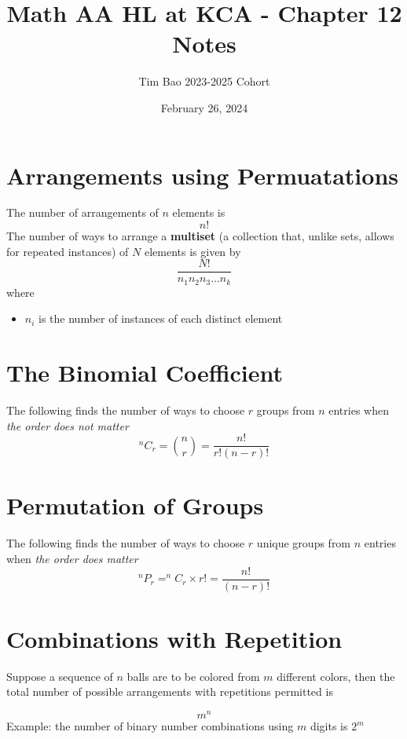 \documentclass[11pt]{article}
\title{Math AA HL at KCA - Chapter 12 Notes}
\author{Tim Bao 2023-2025 Cohort}
\date{February 26, 2024}
\begin{document}
\maketitle
\pagebreak
\tableofcontents
\pagebreak

\section{Arrangements using Permuatations}

The number of arrangements of $n$ elements is
$$n!$$
The number of ways to arrange a \textbf{multiset} (a collection that, unlike sets, allows for repeated instances) of $N$ elements is given by $$\frac{N!}{n_1n_2n_3\dots n_k}$$
where
\begin{itemize}
  \item $n_i$ is the number of instances of each distinct element
\end{itemize}


\section{The Binomial Coefficient}

The following finds the number of ways to choose $r$ groups from $n$ entries when \textit{the order does not matter}
$$^{n}C_{r} = {n \choose r} = \frac{n!}{r!(n-r)!}$$

\section{Permutation of Groups}

The following finds the number of ways to choose $r$ unique groups from $n$ entries when \textit{the order does matter}
$$^{n}P_{r} = ^{n}C_{r} \times r! = \frac{n!}{(n-r)!}$$

\section{Combinations with Repetition}

Suppose a sequence of $n$ balls are to be colored from $m$ different colors, then the total number of possible arrangements with repetitions permitted is

$$m^n$$
Example: the number of binary number combinations using $m$ digits is $2^m$
\end{document}
